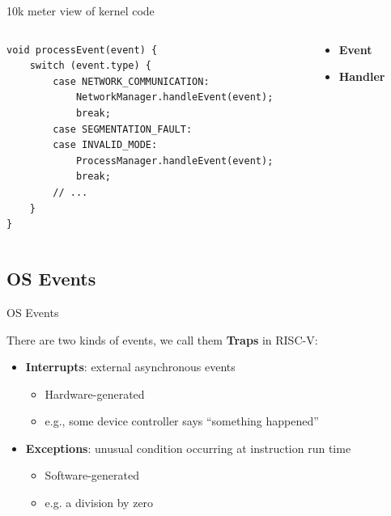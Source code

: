 \begin{frame}[fragile]{10k meter view of kernel code}
	\begin{columns}[T]
		\begin{column}{0.75\textwidth}
			\begin{verbatim}
void processEvent(event) {
    switch (event.type) {
        case NETWORK_COMMUNICATION:
            NetworkManager.handleEvent(event);
            break;
        case SEGMENTATION_FAULT:
        case INVALID_MODE:
            ProcessManager.handleEvent(event);
            break;
        // ...
    }
}
        \end{verbatim}
		\end{column}
		\begin{column}{0.2\textwidth}
			\begin{minipage}[c][.6\textheight][c]{\linewidth}
				\begin{itemize}
					\item \textbf{Event}
					\item \textbf{Handler}
				\end{itemize}
			\end{minipage}
		\end{column}
	\end{columns}
\end{frame}

\subsection{OS Events}


\begin{frame}[fragile]{OS Events}

	There are two kinds of events, we call them \textbf{Traps} in RISC-V\footnotemark:

	\begin{itemize}
		\item \textbf{Interrupts}: external asynchronous events
		      \begin{itemize}
			      \item Hardware-generated
			      \item e.g., some device controller says “something happened”
		      \end{itemize}
		\item \textbf{Exceptions}: unusual condition occurring at instruction run time
		      \begin{itemize}
			      \item Software-generated
			      \item e.g. a division by zero
		      \end{itemize}
	\end{itemize}


\end{frame}

